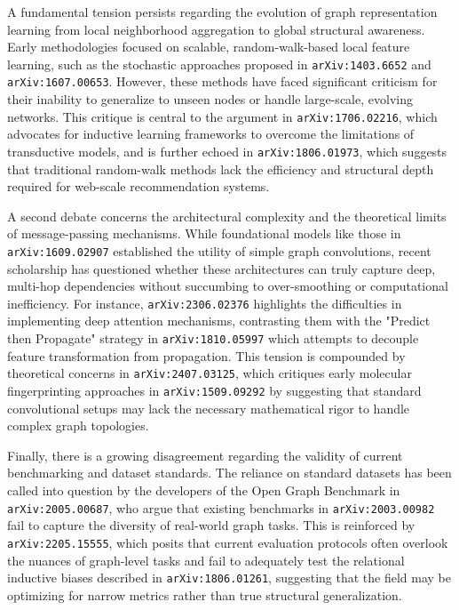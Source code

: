 \documentclass[11pt]{article}
\begin{document}
A fundamental tension persists regarding the evolution of graph representation learning from local neighborhood aggregation to global structural awareness. Early methodologies focused on scalable, random-walk-based local feature learning, such as the stochastic approaches proposed in \texttt{arXiv:1403.6652} and \texttt{arXiv:1607.00653}. However, these methods have faced significant criticism for their inability to generalize to unseen nodes or handle large-scale, evolving networks. This critique is central to the argument in \texttt{arXiv:1706.02216}, which advocates for inductive learning frameworks to overcome the limitations of transductive models, and is further echoed in \texttt{arXiv:1806.01973}, which suggests that traditional random-walk methods lack the efficiency and structural depth required for web-scale recommendation systems.

A second debate concerns the architectural complexity and the theoretical limits of message-passing mechanisms. While foundational models like those in \texttt{arXiv:1609.02907} established the utility of simple graph convolutions, recent scholarship has questioned whether these architectures can truly capture deep, multi-hop dependencies without succumbing to over-smoothing or computational inefficiency. For instance, \texttt{arXiv:2306.02376} highlights the difficulties in implementing deep attention mechanisms, contrasting them with the "Predict then Propagate" strategy in \texttt{arXiv:1810.05997} which attempts to decouple feature transformation from propagation. This tension is compounded by theoretical concerns in \texttt{arXiv:2407.03125}, which critiques early molecular fingerprinting approaches in \texttt{arXiv:1509.09292} by suggesting that standard convolutional setups may lack the necessary mathematical rigor to handle complex graph topologies.

Finally, there is a growing disagreement regarding the validity of current benchmarking and dataset standards. The reliance on standard datasets has been called into question by the developers of the Open Graph Benchmark in \texttt{arXiv:2005.00687}, who argue that existing benchmarks in \texttt{arXiv:2003.00982} fail to capture the diversity of real-world graph tasks. This is reinforced by \texttt{arXiv:2205.15555}, which posits that current evaluation protocols often overlook the nuances of graph-level tasks and fail to adequately test the relational inductive biases described in \texttt{arXiv:1806.01261}, suggesting that the field may be optimizing for narrow metrics rather than true structural generalization.
\end{document}

